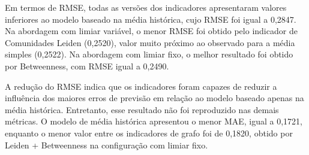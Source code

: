 \begin{table}[H]
\centering
\caption{Desempenho dos indicadores na validação temporal fora da amostra.}
\label{tab:validacao-temporal-indicadores}

\medskip
{}
\end{table}

Em termos de RMSE, todas as versões dos indicadores apresentaram valores inferiores
ao modelo baseado na média histórica, cujo RMSE foi igual a 0,2847. Na abordagem
com limiar variável, o menor RMSE foi obtido pelo indicador de Comunidades Leiden
(0,2520), valor muito próximo ao observado para a média simples (0,2522). Na
abordagem com limiar fixo, o melhor resultado foi obtido por Betweenness, com
RMSE igual a 0,2490.

A redução do RMSE indica que os indicadores foram capazes de reduzir a influência
dos maiores erros de previsão em relação ao modelo baseado apenas na média
histórica. Entretanto, esse resultado não foi reproduzido nas demais métricas. O
modelo de média histórica apresentou o menor MAE, igual a 0,1721, enquanto o menor
valor entre os indicadores de grafo foi de 0,1820, obtido por Leiden +
Betweenness na configuração com limiar fixo.

